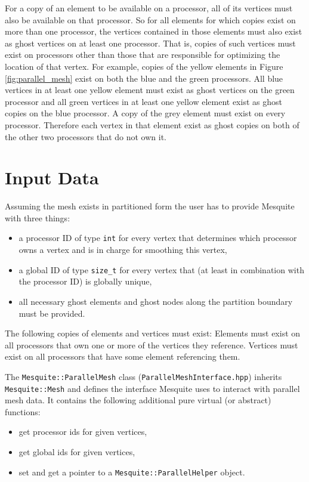 For a copy of an element to be available on a processor, all of its vertices must also be available on that processor.  So for all elements for which copies exist on more than one processor, the vertices contained in those elements must also exist as ghost vertices on at least one processor.  That is, copies of such vertices must exist on processors other than those that are responsible for optimizing the location of that vertex.  For example, copies of the yellow elements in Figure \ref{fig:parallel_mesh} exist on both the blue and the green processors.  All blue vertices in at least one yellow element must exist as ghost vertices on the green processor and all green vertices in at least one yellow element exist as ghost copies on the blue processor.  A copy of the grey element must exist on every processor.  Therefore each vertex in that element exist as ghost copies on both of the other two processors that do not own it.


\section{Input Data}

Assuming the mesh exists in partitioned form the user has to provide Mesquite with three things:
\begin{itemize}
\item a processor ID of type \texttt{int} for every vertex that determines which processor owns a vertex and is in charge for smoothing this vertex,
\item a global ID of type \texttt{size\_t} for every vertex that (at least in combination with the processor ID) is globally unique,
\item all necessary ghost elements and ghost nodes along the partition boundary must be provided.
\end{itemize}

The following copies of elements and vertices must exist: Elements must exist on all processors that own one or more of the vertices they reference. Vertices must exist on all processors that have some element referencing them.

The \texttt{Mesquite::ParallelMesh} class (\texttt{ParallelMeshInterface.hpp}) inherits \texttt{Mesquite::Mesh} and defines the interface Mesquite uses to interact with parallel mesh data. It contains the following additional pure virtual (or abstract) functions:
\begin{itemize}
\item get processor ids for given vertices,
\item get global ids for given vertices,
\item set and get a pointer to a \texttt{Mesquite::ParallelHelper} object.
\end{itemize}

